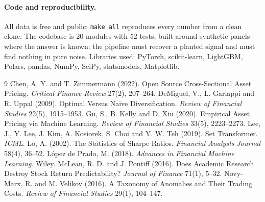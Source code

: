 \documentclass[11pt,a4paper]{article}
\begin{document}
\paragraph{Code and reproducibility.} All data is free and public; \texttt{make
all} reproduces every number from a clean clone. The codebase is 20 modules with
52 tests, built around synthetic panels where the answer is known: the pipeline
must recover a planted signal and must find nothing in pure noise. Libraries used:
PyTorch, scikit-learn, LightGBM, Polars, pandas, NumPy, SciPy, statsmodels,
Matplotlib.

\begin{thebibliography}{9}\small
{}
Chen, A. Y. and T. Zimmermann (2022). Open Source Cross-Sectional Asset Pricing.
\emph{Critical Finance Review} 27(2), 207--264.
DeMiguel, V., L. Garlappi and R. Uppal (2009). Optimal Versus Naive
Diversification. \emph{Review of Financial Studies} 22(5), 1915--1953.
Gu, S., B. Kelly and D. Xiu (2020). Empirical Asset Pricing via Machine Learning.
\emph{Review of Financial Studies} 33(5), 2223--2273.
Lee, J., Y. Lee, J. Kim, A. Kosiorek, S. Choi and Y. W. Teh (2019). Set
Transformer. \emph{ICML}.
Lo, A. (2002). The Statistics of Sharpe Ratios. \emph{Financial Analysts Journal}
58(4), 36--52.
L\'opez de Prado, M. (2018). \emph{Advances in Financial Machine Learning}. Wiley.
McLean, R. D. and J. Pontiff (2016). Does Academic Research Destroy Stock Return
Predictability? \emph{Journal of Finance} 71(1), 5--32.
Novy-Marx, R. and M. Velikov (2016). A Taxonomy of Anomalies and Their Trading
Costs. \emph{Review of Financial Studies} 29(1), 104--147.
\end{thebibliography}
\end{document}
